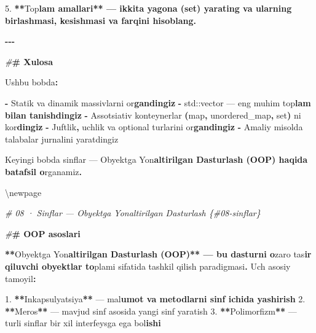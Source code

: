 \documentclass[a4paper,11pt,twoside,openright]{book}
\newenvironment{Shaded}{\begin{snugshade}}{\end{snugshade}}
\newcommand{\BuiltInTok}[1]{#1}
\newcommand{\CharTok}[1]{\textcolor[rgb]{0.31,0.60,0.02}{#1}}
\newcommand{\ErrorTok}[1]{\textcolor[rgb]{0.64,0.00,0.00}{\textbf{#1}}}
\newcommand{\FloatTok}[1]{\textcolor[rgb]{0.00,0.00,0.81}{#1}}
\newcommand{\NormalTok}[1]{#1}
\newcommand{\OperatorTok}[1]{\textcolor[rgb]{0.81,0.36,0.00}{\textbf{#1}}}
\newcommand{\PreprocessorTok}[1]{\textcolor[rgb]{0.56,0.35,0.01}{\textit{#1}}}
\begin{document}
\begin{Shaded}
\begin{Highlighting}[]
\FloatTok{5.} \OperatorTok{**}\NormalTok{To}\CharTok{\textquotesingle{}p}\ErrorTok{lam amallari** — ikkita \textasciigrave{}yagona\textasciigrave{} (set) yarating va ularning birlashmasi, kesishmasi va farqini hisoblang.}

\OperatorTok{{-}{-}{-}}

\PreprocessorTok{\#}\ErrorTok{\# Xulosa}

\NormalTok{Ushbu bobda}\OperatorTok{:}

\OperatorTok{{-}}\NormalTok{ Statik va dinamik massivlarni o}\CharTok{\textquotesingle{}r}\ErrorTok{gandingiz}
\OperatorTok{{-}} \ErrorTok{\textasciigrave{}}\BuiltInTok{std::}\NormalTok{vector}\ErrorTok{\textasciigrave{}}\NormalTok{ — eng muhim to}\CharTok{\textquotesingle{}p}\ErrorTok{lam bilan tanishdingiz}
\OperatorTok{{-}}\NormalTok{ Assotsiativ konteynerlar }\OperatorTok{(}\ErrorTok{\textasciigrave{}}\NormalTok{map}\ErrorTok{\textasciigrave{}}\OperatorTok{,} \ErrorTok{\textasciigrave{}}\NormalTok{unordered\_map}\ErrorTok{\textasciigrave{}}\OperatorTok{,} \ErrorTok{\textasciigrave{}}\NormalTok{set}\ErrorTok{\textasciigrave{}}\OperatorTok{)}\NormalTok{ ni ko}\CharTok{\textquotesingle{}r}\ErrorTok{dingiz}
\OperatorTok{{-}}\NormalTok{ Juftlik}\OperatorTok{,}\NormalTok{ uchlik va }\ErrorTok{\textasciigrave{}}\NormalTok{optional}\ErrorTok{\textasciigrave{}}\NormalTok{ turlarini o}\CharTok{\textquotesingle{}r}\ErrorTok{gandingiz}
\OperatorTok{{-}}\NormalTok{ Amaliy misolda talabalar jurnalini yaratdingiz}

\NormalTok{Keyingi bobda sinflar — Obyektga Yo}\CharTok{\textquotesingle{}n}\ErrorTok{altirilgan Dasturlash (OOP) haqida batafsil o}\CharTok{\textquotesingle{}}\NormalTok{rganamiz}\OperatorTok{.}


\NormalTok{\textbackslash{}newpage}

\PreprocessorTok{\# 08 · Sinflar — Obyektga Yo\textquotesingle{}naltirilgan Dasturlash \{\#08{-}sinflar\}}

\PreprocessorTok{\#}\ErrorTok{\# OOP asoslari}

\OperatorTok{**}\NormalTok{Obyektga Yo}\CharTok{\textquotesingle{}n}\ErrorTok{altirilgan Dasturlash (OOP)** — bu dasturni o}\CharTok{\textquotesingle{}}\NormalTok{zaro ta}\CharTok{\textquotesingle{}s}\ErrorTok{ir qiluvchi obyektlar to}\CharTok{\textquotesingle{}}\NormalTok{plami sifatida tashkil qilish paradigmasi}\OperatorTok{.}\NormalTok{ Uch asosiy tamoyil}\OperatorTok{:}

\FloatTok{1.} \OperatorTok{**}\NormalTok{Inkapsulyatsiya}\OperatorTok{**}\NormalTok{ — ma}\CharTok{\textquotesingle{}l}\ErrorTok{umot va metodlarni sinf ichida yashirish}
\FloatTok{2.} \OperatorTok{**}\NormalTok{Meros}\OperatorTok{**}\NormalTok{ — mavjud sinf asosida yangi sinf yaratish}
\FloatTok{3.} \OperatorTok{**}\NormalTok{Polimorfizm}\OperatorTok{**}\NormalTok{ — turli sinflar bir xil interfeysga ega bo}\CharTok{\textquotesingle{}l}\ErrorTok{ishi}


\end{Highlighting}
\end{Shaded}
\end{document}
